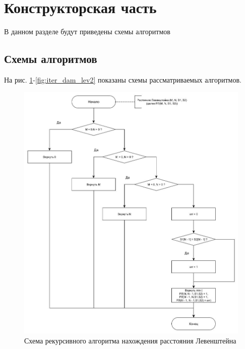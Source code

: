 \documentclass[14pt,russian]{scrartcl}
\begin{document}
\section{Конструкторская часть}

В данном разделе будут приведены схемы алгоритмов

		
\subsection{Схемы алгоритмов}
На рис. \ref{fig:rec_lev}-\ref{fig:iter_dam_lev2}  показаны схемы рассматриваемых алгоритмов.
\begin{figure}[h]
	\centering
	\includegraphics[scale=0.5]{rec_lev.jpg}
	\caption{Схема рекурсивного алгоритма нахождения расстояния Левенштейна}
	\label{fig:rec_lev}
\end{figure}
\end{document}
